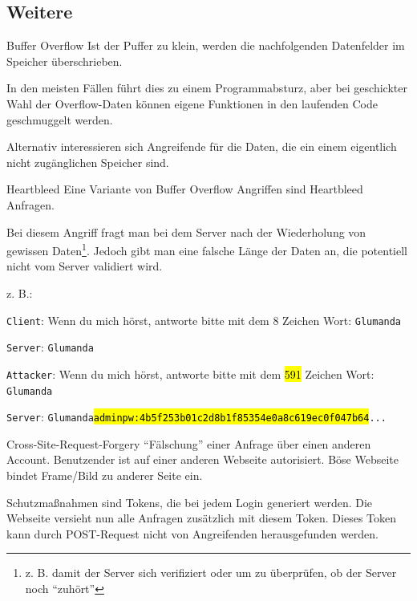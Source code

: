 \subsection{Weitere}

\begin{defi}{Buffer Overflow}
    Ist der Puffer zu klein, werden die nachfolgenden Datenfelder im Speicher überschrieben.

    In den meisten Fällen führt dies zu einem Programmabsturz, aber bei geschickter Wahl der Overflow-Daten können eigene Funktionen in den laufenden Code geschmuggelt werden.

    Alternativ interessieren sich Angreifende für die Daten, die ein einem eigentlich nicht zugänglichen Speicher sind.
\end{defi}

\begin{bonus}{Heartbleed}
    Eine Variante von Buffer Overflow Angriffen sind Heartbleed Anfragen.

    Bei diesem Angriff fragt man bei dem Server nach der Wiederholung von gewissen Daten\footnote{z. B. damit der Server sich verifiziert oder um zu überprüfen, ob der Server noch \enquote{zuhört}}.
    Jedoch gibt man eine falsche Länge der Daten an, die potentiell nicht vom Server validiert wird.

    z. B.:

    \texttt{Client}: Wenn du mich hörst, antworte bitte mit dem 8 Zeichen Wort: \texttt{Glumanda}

    \texttt{Server}: \texttt{Glumanda}

    \texttt{Attacker}: Wenn du mich hörst, antworte bitte mit dem \hl{591} Zeichen Wort: \texttt{Glumanda}

    \texttt{Server}: \texttt{Glumanda\hl{adminpw:4b5f253b01c2d8b1f85354e0a8c619ec0f047b64}...}
\end{bonus}

\begin{defi}{Cross-Site-Request-Forgery}
    \enquote{Fälschung} einer Anfrage über einen anderen Account.
    Benutzender ist auf einer anderen Webseite autorisiert.
    Böse Webseite bindet Frame/Bild zu anderer Seite ein.

    Schutzmaßnahmen sind Tokens, die bei jedem Login generiert werden.
    Die Webseite versieht nun alle Anfragen zusätzlich mit diesem Token.
    Dieses Token kann durch POST-Request nicht von Angreifenden herausgefunden werden.
\end{defi}

